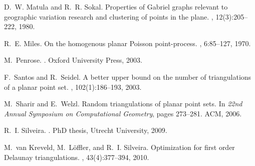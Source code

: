 \documentclass {journal}
\begin{document}
\begin{thebibliography}{99}
D.~W. Matula and R.~R. Sokal.
\newblock Properties of {Gabriel} graphs relevant to geographic variation
  research and clustering of points in the plane.
, 12(3):205--222, 1980.

R.~E. Miles.
\newblock On the homogenous planar {Poisson} point-process.
, 6:85--127, 1970.

M.~Penrose.
.
\newblock Oxford University Press, 2003.

F.~Santos and R.~Seidel.
\newblock A better upper bound on the number of triangulations of a planar
  point set.
, 102(1):186--193, 2003.

M.~Sharir and E.~Welzl.
\newblock Random triangulations of planar point sets.
\newblock In {\em 22nd Annual Symposium on Computational Geometry}, pages
  273--281. ACM, 2006.

R.~I. Silveira.
.
\newblock PhD thesis, Utrecht University, 2009.

M.~van Kreveld, M.~L{\"o}ffler, and R.~I. Silveira.
\newblock Optimization for first order {D}elaunay triangulations.
, 43(4):377--394, 2010.

\end{thebibliography}
\end{document}
